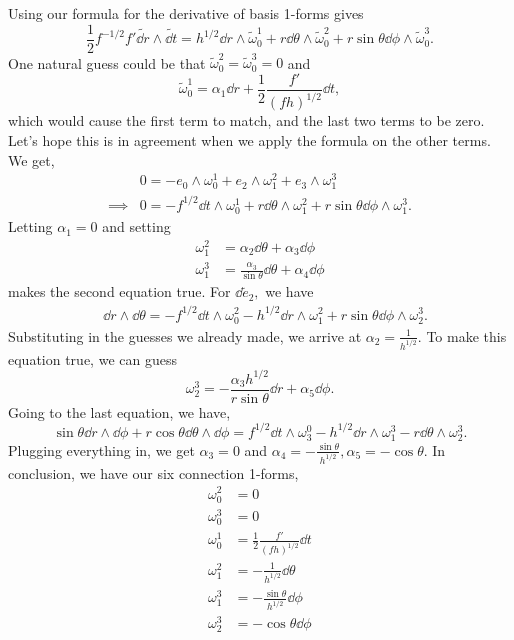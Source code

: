 \documentclass{article}
\numberwithin{equation}{section}
\begin{document}
Using our formula for the derivative of basis 1-forms gives
\begin{equation*}
    \frac{1}{2}f^{-1/2}f' \tilde{\dd{r}}\wedge \tilde{\dd{t}} = h^{1/2} \dd{r} \wedge \tilde{\omega}_0^1 + r\dd{\theta} \wedge \tilde{\omega}_0^2 + r\sin\theta \dd{\phi} \wedge \tilde{\omega}_0^3.
\end{equation*}
One natural guess could be that $\tilde{\omega}_0^2=\tilde{\omega}_0^3=0$ and
\begin{equation*}
    \tilde{\omega}_0^1 = \alpha_1 \dd{r} + \frac{1}{2} \frac{f'}{(fh)^{1/2}}\dd{t},
\end{equation*}
which would cause the first term to match, and the last two terms to be zero. Let's hope this is in agreement when we apply the formula on the other terms. We get, 
\begin{align*}
    & 0 = -e_0 \wedge \omega_0^1 + e_2 \wedge \omega_1^2 + e_3 \wedge \omega_1^3 \\ 
    \implies & 0 = -f^{1/2} \dd{t}\wedge \omega_0^1 + r\dd{\theta}\wedge \omega^2_1 + r\sin\theta \dd{\phi} \wedge \omega^3_1.
\end{align*}
Letting $\alpha_1=0$ and setting
\begin{align*}
    \omega_1^2 &= \alpha_2 \dd{\theta} + \alpha_3 \dd{\phi} \\ 
    \omega_1^3 &= \frac{\alpha_3}{\sin\theta}\dd{\theta} + \alpha_4 \dd{\phi}
\end{align*}
makes the second equation true. For $\dd{\tilde{e}_2},$ we have 
\begin{align*}
    & \dd{r}\wedge \dd{\theta} = -f^{1/2} \dd{t}\wedge \omega_0^2 - h^{1/2}\dd{r}\wedge \omega_1^2 + r\sin\theta \dd{\phi} \wedge \omega_2^3.
\end{align*}
Substituting in the guesses we already made, we arrive at $\alpha_2 = \frac{1}{h^{1/2}}.$ To make this equation true, we can guess 
\begin{equation*}
    \omega_2^3 =  - \frac{\alpha_3 h^{1/2}}{r\sin\theta}\dd{r} + \alpha_5 \dd{\phi}.
\end{equation*}
Going to the last equation, we have,
\begin{equation*}
    \sin\theta \dd{r} \wedge \dd{\phi} + r\cos\theta \dd{\theta} \wedge \dd{\phi} = f^{1/2}\dd{t}\wedge \omega_3^0 - h^{1/2}\dd{r}\wedge \omega_1^3 - r\dd{\theta}\wedge \omega_2^3.
\end{equation*}
Plugging everything in, we get $\alpha_3=0$ and $\alpha_4 = -\frac{\sin\theta}{h^{1/2}}, \alpha_5=-\cos\theta.$ In conclusion, we have our six connection 1-forms,
\begin{align*}
    \omega_0^2 &= 0 \\ 
    \omega_0^3 &= 0 \\ 
    \omega_0^1 &= \frac{1}{2} \frac{f'}{(fh)^{1/2}}\dd{t} \\ 
    \omega_1^2 &= -\frac{1}{h^{1/2}}\dd{\theta} \\ 
    \omega_1^3 &= -\frac{\sin\theta}{h^{1/2}}\dd{\phi} \\ 
    \omega_2^3 &= -\cos\theta \dd{\phi}
\end{align*}
\end{document}
